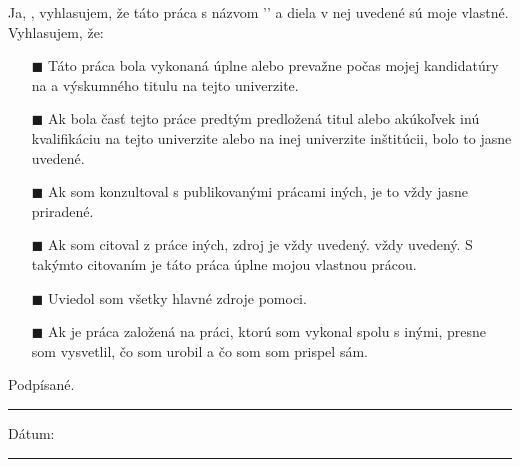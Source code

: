 Ja, \authornames, vyhlasujem, že táto práca s názvom '\ttitle' a
diela v nej uvedené sú moje vlastné. Vyhlasujem, že:

\begin{itemize}

\item[\tiny{$\blacksquare$}]
  Táto práca bola vykonaná úplne alebo prevažne počas mojej kandidatúry na a
  výskumného titulu na tejto univerzite.

\item[\tiny{$\blacksquare$}]
  Ak bola časť tejto práce predtým predložená
  titul alebo akúkoľvek inú kvalifikáciu na tejto univerzite alebo na inej univerzite
  inštitúcii, bolo to jasne uvedené.

\item[\tiny{$\blacksquare$}]
  Ak som konzultoval s publikovanými prácami iných, je to vždy
  jasne priradené.

\item[\tiny{$\blacksquare$}]
  Ak som citoval z práce iných, zdroj je vždy uvedený.
  vždy uvedený. S takýmto citovaním je táto práca úplne
  mojou vlastnou prácou.

\item[\tiny{$\blacksquare$}]
  Uviedol som všetky hlavné zdroje pomoci.

\item[\tiny{$\blacksquare$}]
  Ak je práca založená na práci, ktorú som vykonal spolu s inými,
  presne som vysvetlil, čo som urobil a čo som
  som prispel sám.

\end{itemize}

Podpísané.
\rule[1em]{25em}{0,5pt} %

Dátum:\
\rule[1em]{25em}{0,5pt} %
